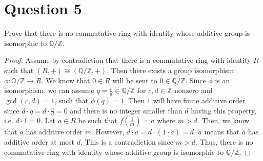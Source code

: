 \section{Question 5}

\begin{question}
    Prove that there is no commutative ring with identity whose additive group is isomorphic to $\mathbb{Q} / \mathbb{Z}$.
\end{question}

\begin{answer}
    \begin{proof}
        Assume by contradiction that there is a commutative ring with identity $R$ such that $(R,+) \cong (\mathbb{Q}/\mathbb{Z}, +)$. Then there exists a group isomorphism $\phi: \mathbb{Q}/\mathbb{Z} \to R$. We know that $0 \in R$ will be sent to $0 \in \mathbb{Q}/\mathbb{Z}$. Since $\phi$ is an isomorphism, we can assume $q = \tfrac{c}{d} \in \mathbb{Q}/\mathbb{Z}$ for $c,d \in \mathbb{Z}$ nonzero and $\gcd(c,d)=1$, such that $\phi(q) = 1$. Then $1$ will have finite additive order since $d \cdot q = d \cdot \tfrac{c}{d} = 0$ and there is no integer smaller than $d$ having this property, i.e. $d \cdot 1 = 0$. Let $a \in R$ be such that $f\left(\tfrac{1}{m}\right) = a$ where $m > d$. Then, we know that $a$ has additive order $m$. However, $d \cdot a = d \cdot (1 \cdot a) = d \cdot a$ means that $a$ has additive order at most $d$. This is a contradiction since $m > d$. Thus, there is no commutative ring with identity whose additive group is isomorphic to $\mathbb{Q}/\mathbb{Z}$.
    \end{proof}
\end{answer}